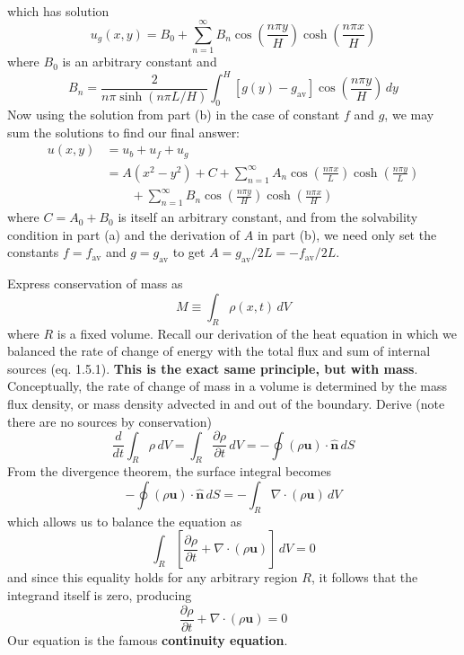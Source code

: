 \documentclass[a4paper]{article}
\begin{document}
\begin{enumerate}[label=(\alph*)]
\begin{align*}
	\end{align*}
	which has solution
	\[
		u_{g}\!\left( x,y \right) = B_{0} + \sum^{\infty}_{n=1} B_{n}\cos\!\left(\frac{n \pi y}{H}\right)\cosh\!\left(\frac{n \pi x}{H}\right) 
	\]
	where \( B_{0} \) is an arbitrary constant and
	\[
		B_{n} = \frac{2}{n \pi \sinh\!\left( n \pi L / H\right)}\int^{H}_{0} \!\left[  g \!\left( y \right) - g_{\text{av}} \right]\cos\!\left(\frac{n \pi y}{H}\right) \, dy  
	\]
	Now using the solution from part (b) in the case of constant \( f \) and \( g \), we may sum the solutions to find our final answer:
	\begin{align*}
		u \!\left( x,y \right) & = u_{b} + u_{f} + u_{g} \\
		 & = A \!\left( x^{2} - y^{2} \right) + C + \sum^{\infty}_{n=1} A_{n}\cos\!\left(\frac{n \pi x}{L}\right)\cosh\!\left(\frac{n \pi y}{L}\right) \\ 
		 & \qquad + \sum^{\infty}_{n=1} B_{n}\cos\!\left(\frac{n \pi y}{H}\right)\cosh\!\left(\frac{n \pi x}{H}\right)
	\end{align*}
	where \( C = A_{0} + B_{0} \) is itself an arbitrary constant, and from the solvability condition in part (a) and the derivation of \( A \) in part (b), we need only set the constants \( f = f_{\text{av}} \) and \( g = g_{\text{av}} \) to get \( A = g_{\text{av}} / 2L = -f_{\text{av}} / 2L \).
\end{enumerate}


Express conservation of mass as 
\[
	M \equiv \int_{R} \rho \!\left( x,t \right) \, dV  
\]
where \( R \) is a fixed volume. Recall our derivation of the heat equation in which we balanced the rate of change of energy with the total flux and sum of internal sources (eq. 1.5.1). \textbf{This is the exact same principle, but with mass}. Conceptually, the rate of change of mass in a volume is determined by the mass flux density, or mass density advected in and out of the boundary. Derive (note there are no sources by conservation)
\[
	\frac{d }{d t} \int_{R} \rho \, dV = \int_{R} \frac{\partial \rho}{\partial t} \, dV = -\oint \!\left( \rho\pmb{u} \right) \cdot \pmb{\hat{n}} \, dS
\]
From the divergence theorem, the surface integral becomes
\[
	-\oint \!\left( \rho\pmb{u} \right) \cdot \pmb{\hat{n}} \, dS = -\int_{R} \nabla \cdot \!\left( \rho \pmb{u} \right) \, dV 
\]
which allows us to balance the equation as 
\[
	\int_{R} \!\left[ \frac{\partial \rho}{\partial t} + \nabla \cdot \!\left( \rho \pmb{u} \right) \right] \, dV = 0
\]
and since this equality holds for any arbitrary region \( R \), it follows that the integrand itself is zero, producing
\[
	\frac{\partial \rho}{\partial t} + \nabla \cdot \!\left( \rho \pmb{u} \right) = 0 
\]
Our equation is the famous \textbf{continuity equation}.
\end{document}
